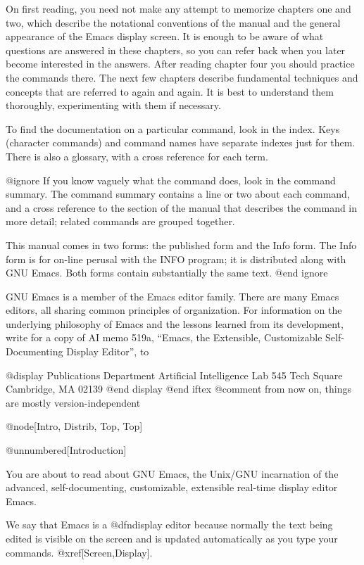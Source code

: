   On first reading, you need not make any attempt to memorize chapters one
and two, which describe the notational conventions of the manual and the
general appearance of the Emacs display screen.  It is enough to be aware
of what questions are answered in these chapters, so you can refer back
when you later become interested in the answers.  After reading chapter
four you should practice the commands there.  The next few chapters
describe fundamental techniques and concepts that are referred to again and
again.  It is best to understand them thoroughly, experimenting with them
if necessary.

  To find the documentation on a particular command, look in the
index.  Keys (character commands) and command names have separate
indexes just for them.  There is also a glossary, with a cross
reference for each term.

@ignore
  If you know vaguely what the command
does, look in the command summary.  The command summary contains a line or
two about each command, and a cross reference to the section of the
manual that describes the command in more detail; related commands
are grouped together.

  This manual comes in two forms: the published form and the Info
form.  The Info form is for on-line perusal with the INFO program;
it is distributed along with GNU Emacs.  Both forms contain
substantially the same text.
@end ignore

  GNU Emacs is a member of the Emacs editor family.  There are many Emacs
editors, all sharing common principles of organization.  For information on
the underlying philosophy of Emacs and the lessons learned from its
development, write for a copy of AI memo 519a, ``Emacs, the Extensible,
Customizable Self-Documenting Display Editor'', to

@display
Publications Department
Artificial Intelligence Lab
545 Tech Square
Cambridge, MA 02139
@end display
@end iftex
@comment from now on, things are mostly version-independent

@node[Intro, Distrib, Top, Top]

@unnumbered[Introduction]

  You are about to read about GNU Emacs, the Unix/GNU incarnation of the
advanced, self-documenting, customizable, extensible real-time display
editor Emacs.

  We say that Emacs is a @dfn{display} editor because normally the text
being edited is visible on the screen and is updated automatically as you
type your commands.  @xref[Screen,Display].

